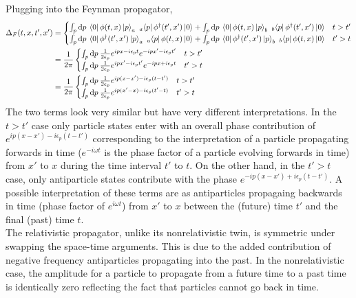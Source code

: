 \documentclass[12pt]{extarticle}
\begin{document}
Plugging into the Feynman propagator,
\begin{align*}
\Delta_F(t, x, t', x') & = 
\begin{cases}
\int_{p} \mathrm{d}p \: \left< 0 \right| \phi(t, x) \left| p \right>_a ~_a\!\left< p \right| \phi^\dagger(t', x') \left| 0 \right> + \int_{p} \mathrm{d}p \: \left< 0 \right| \phi(t, x) \left| p \right>_b ~_b\!\left< p \right| \phi^\dagger(t', x') \left| 0 \right> & t > t' \\
\int_{p} \mathrm{d}p \: \left< 0 \right| \phi^\dagger(t', x') \left| p \right>_a ~_a\!\left< p \right| \phi(t, x)  \left| 0 \right> + \int_{p} \mathrm{d}p \: \left< 0 \right| \phi^\dagger(t', x') \left| p \right>_b ~_b\!\left< p \right| \phi(t, x) \left| 0 \right> & t' > t
\end{cases}
\\
& = \frac{1}{2\pi}
\begin{cases}
\int_{p} \mathrm{d}p \: \frac{1}{2 \epsilon_p} e^{i p x - i \epsilon_{p} t} e^{ - i p x' - i \epsilon_{p} t'} & t > t' \\
\int_{p} \mathrm{d}p \: \frac{1}{2 \epsilon_p} e^{i p x' - i \epsilon_{p} t'} e^{ - i p x + i \epsilon_{p} t} & t' > t
\end{cases}
\\
& = \frac{1}{2\pi}
\begin{cases}
\int_{p} \mathrm{d}p \: \frac{1}{2 \epsilon_p} e^{i p (x - x') - i \epsilon_{p} (t - t')}  & t > t' \\
\int_{p} \mathrm{d}p \: \frac{1}{2 \epsilon_p} e^{i p (x' - x) - i \epsilon_{p} (t' - t)}  & t' > t
\end{cases}
\end{align*}
The two terms look very similar but have very different interpretations. In the $t > t'$ case only particle states enter with an overall phase contribution of $e^{i p (x - x') - i \epsilon_{p} (t - t')}$ corresponding to the interpretation of a particle propagating forwards in time ($e^{- i \omega t}$ is the phase factor of a particle evolving forwards in time) from $x'$ to $x$ during the time interval $t'$ to $t$. On the other hand, in the $t' > t$ case, only antiparticle states contribute with the phase $e^{-i p (x - x') + i \epsilon_{p} (t - t')}$. A possible interpretation of these terms are as antiparticles propagaing backwards in time (phase factor of $e^{i \omega t}$) from $x'$ to $x$ between the (future) time $t'$ and the final (past) time $t$. \bigskip \\ 
The relativistic propagator, unlike its nonrelativistic twin, is symmetric under swapping the space-time arguments. This is due to the added contribution of negative frequency antiparticles propagating into the past. In the nonrelativistic case, the amplitude for a particle to propagate from a future time to a past time is identically zero reflecting the fact that particles cannot go back in time. \bigskip \\
\end{document}
